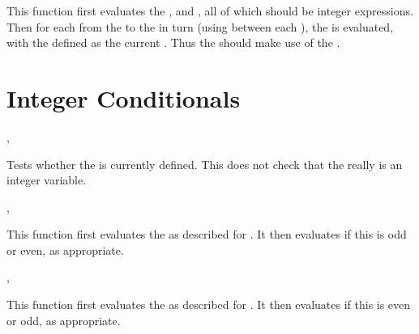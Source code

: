 \documentclass[oneside]{book}
\begin{document}
\begin{function}{\IntStepVariable}
\begin{syntax}
     
\end{syntax}
This function first evaluates the , 
and , all of which should be integer expressions.
Then for each  from the  to the
 in turn (using  between each
), the  is evaluated,
with the  defined as the current . Thus
the  should make use of the .
\end{function}

\section{Integer Conditionals}

\begin{function}{\IntIfExist, \IntIfExistTF}
\begin{syntax}
 
   
\end{syntax}
Tests whether the  is currently defined.  This does not
check that the  really is an integer variable.
\end{function}

\begin{function}{\IntIfOdd,\IntIfOddTF}
\begin{syntax}
 
   
\end{syntax}
This function first evaluates the 
as described for .
It then evaluates if this is odd or even, as appropriate.
\end{function}

\begin{function}{\IntIfEven,\IntIfEvenTF}
\begin{syntax}
 
   
\end{syntax}
This function first evaluates the 
as described for .
It then evaluates if this is even or odd, as appropriate.
\end{function}
\end{document}
